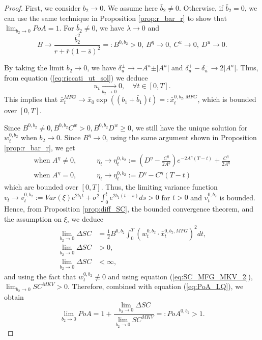 \documentclass[11pt]{article}
\begin{document}
\begin{proof}
    First, we consider $b_2 \to 0$. We assume here $\bar{b}_2 \neq 0$. Otherwise, if $\bar{b}_2 =0$, we can use the same technique in Proposition \ref{prop:r_bar_r} to show that $\lim_{b_2 \to 0} PoA = 1$. 
    For $\bar{b}_2 \neq 0$, we have $\lambda \to 0 $ and
	$$ B \to \frac{\bar{b}_2^2}{r + \bar{r}(1-\bar{s})^2}=:B^{0,b_2} >0,\ B^{\eta} \to 0,\ C^u \to 0,\ D^u \to 0.$$
	
	By taking the limit $b_2 \to 0$, we have $\delta^\pm_u \to -A^u \pm \vert A^u \vert $ and $\delta^{+}_u - \delta^{-}_u \to 2 \vert A^u \vert $. Thus, from equation (\ref{eq:riccati_ut_sol}) we deduce
	$$u_t \xrightarrow[b_2 \to 0 ]{} 0, \quad \forall t \in [0,T].$$
	This implies that $\bar{x}_t^{MFG} \to \bar{x}_0 \exp((b_1+\bar{b}_1)t) =: \bar{x}_t^{0,b_2,MFG}$, which is bounded over $[0,T]$.
	
	Since $B^{0,b_2} \neq0, B^{0,b_2}C^w >0, B^{0,b_2}D^w \geq 0$, we still have the unique solution for $w^{0,b_2}_t$ when $b_2 \to 0$. Since $B^{\eta} \to 0$, using the same argument shown in Proposition \ref{prop:r_bar_r}, we get
	\begin{equation*}
	\begin{split}
	    \text{when } A^\eta \neq 0, \qquad & \eta_t \to \eta^{0,b_2}_t := \left(D^{\eta} - \frac{C^{\eta}}{2A^\eta}\right) e^{-2A^\eta(T-t)} + \frac{C^\eta}{2A^{\eta} }\\
	    \text{when } A^{\eta} = 0, \qquad & \eta_t \to \eta^{0,b_2}_t := D^{\eta} - C^{\eta}(T-t)
	\end{split}
	\end{equation*}
	which are bounded over $[0,T]$. Thus, the limiting variance function $ v_t \to  v^{0,b_2}_t := Var(\xi)e^{2b_1t}+ \sigma^2 \int_0^t e^{2b_1(t-s)}ds>0$ for $t>0$ and $v^{0,b_2}_t$ is bounded.
	Hence, from Proposition \ref{prop:diff_SC}, the bounded convergence theorem, and the assumption on $\xi$, we deduce
	\begin{equation*}
	\begin{split}
	    \lim_{b_2 \to 0} \Delta SC &= \frac{1}{2} B^{0,b_2} \int_0^T (w_t^{0,b_2} \cdot \bar{x}_t^{0,b_2,MFG})^2 dt,\\
	    \lim_{b_2 \to 0} \Delta SC &>0, \\
	    \lim_{b_2 \to 0} \Delta SC &< \infty ,
	\end{split}
	\end{equation*}
	and using the fact that $w^{0,b_2}_t\not \equiv 0$  and using equation (\ref{eq:SC_MFG_MKV_2}), $ \lim_{b_2\to 0} SC^{MKV} >0 $.
	Therefore, combined with equation (\ref{eq:PoA_LQ}), we obtain $$\lim_{b_2 \to 0} PoA = 1 + \frac{\displaystyle \lim_{b_2 \to 0}\Delta SC}{\displaystyle \lim_{b_2 \to 0} SC^{MKV} } =: PoA^{0,b_2} > 1.$$
	

\end{proof}
\end{document}
